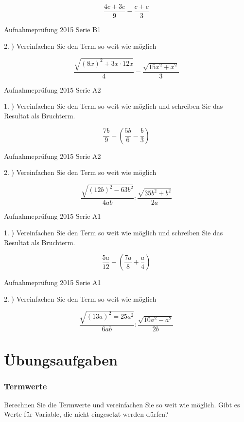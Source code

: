 {$$\frac{4c+3e}{9} - \frac{c+e}{3}$$

Aufnahmeprüfung 2015 Serie B1

2. ) Vereinfachen Sie den Term so weit wie möglich

$$\frac{\sqrt{(8x)^2+3x\cdot{}12x}}4 - \frac{\sqrt{15x^2+x^2}}3$$

Aufnahmeprüfung 2015 Serie A2

1. ) Vereinfachen Sie den Term so weit wie möglich und schreiben Sie
das Resultat als Bruchterm.

$$\frac{7b}9 - \left( \frac{5b}6 - \frac{b}3 \right)$$

Aufnahmeprüfung 2015 Serie A2

2. ) Vereinfachen Sie den Term so weit wie möglich

$$\frac{\sqrt{(12b)^2 - 63b^2}}{4ab} : \frac{\sqrt{35b^2 + b^2}}{2a}$$

Aufnahmeprüfung 2015 Serie A1

1. ) Vereinfachen Sie den Term so weit wie möglich und schreiben Sie
das Resultat als Bruchterm.

$$\frac{5a}{12} - \left( \frac{7a}8 + \frac{a}4 \right)$$

Aufnahmeprüfung 2015 Serie A1

2. ) Vereinfachen Sie den Term so weit wie möglich

$$\frac{\sqrt{(13a)^2 = 25a^2}}{6ab} : \frac{\sqrt{10a^2 - a^2}}{2b}$$

\newpage


\part{Übungsaufgaben}

\section{Termwerte}
Berechnen Sie die Termwerte und vereinfachen Sie so weit wie
möglich. Gibt es Werte für Variable, die nicht eingesetzt werden dürfen?

}

